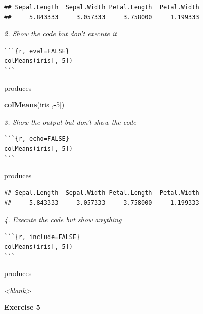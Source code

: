 \documentclass[]{article}
\newenvironment{Shaded}{\begin{snugshade}}{\end{snugshade}}
\newcommand{\DecValTok}[1]{\textcolor[rgb]{0.00,0.00,0.81}{#1}}
\newcommand{\KeywordTok}[1]{\textcolor[rgb]{0.13,0.29,0.53}{\textbf{#1}}}
\newcommand{\NormalTok}[1]{#1}
\newcommand{\OperatorTok}[1]{\textcolor[rgb]{0.81,0.36,0.00}{\textbf{#1}}}
\begin{document}
\begin{verbatim}
## Sepal.Length  Sepal.Width Petal.Length  Petal.Width 
##     5.843333     3.057333     3.758000     1.199333
\end{verbatim}

\emph{2. Show the code but don't execute it}

\begin{verbatim}
```{r, eval=FALSE}
colMeans(iris[,-5])
```
\end{verbatim}

produces

\begin{Shaded}
\begin{Highlighting}[]
\KeywordTok{colMeans}\NormalTok{(iris[,}\OperatorTok{-}\DecValTok{5}\NormalTok{])}
\end{Highlighting}
\end{Shaded}

\emph{3. Show the output but don't show the code}

\begin{verbatim}
```{r, echo=FALSE}
colMeans(iris[,-5])
```
\end{verbatim}

produces

\begin{verbatim}
## Sepal.Length  Sepal.Width Petal.Length  Petal.Width 
##     5.843333     3.057333     3.758000     1.199333
\end{verbatim}

\emph{4. Execute the code but show anything}

\begin{verbatim}
```{r, include=FALSE}
colMeans(iris[,-5])
```
\end{verbatim}

produces

\emph{\textless{}blank\textgreater{}}

\textbf{Exercise 5}
\end{document}
